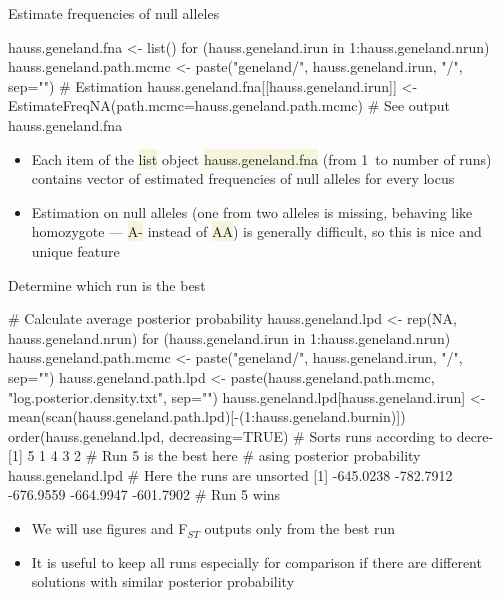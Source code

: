 \documentclass[compress, xelatex, 11pt, xcolor=svgnames, aspectratio=169, url={hyphens, lowtilde}]{beamer}
\renewcommand{\texttt}[1]{\colorbox{Beige}{{\ttfamily #1}}}
\begin{document}
\begin{frame}[fragile]{Estimate frequencies of null alleles}
	\begin{spluscode}
    hauss.geneland.fna <- list()
    for (hauss.geneland.irun in 1:hauss.geneland.nrun) {
      hauss.geneland.path.mcmc <- paste("geneland/", hauss.geneland.irun,
        "/", sep="")
      # Estimation
      hauss.geneland.fna[[hauss.geneland.irun]] <-
        EstimateFreqNA(path.mcmc=hauss.geneland.path.mcmc)
      }
    # See output
    hauss.geneland.fna
	\end{spluscode}
	\begin{itemize}
		\item Each item of the \texttt{list} object \texttt{hauss.geneland.fna} (from 1~to number of runs) contains vector of estimated frequencies of null alleles for every locus
		\item Estimation on null alleles (one from two alleles is missing, behaving like homozygote --- \texttt{A-} instead of \texttt{AA}) is generally difficult, so this is nice and unique feature
	\end{itemize}
\end{frame}

\begin{frame}[fragile]{Determine which run is the best}
	\begin{spluscode}
    # Calculate average posterior probability
    hauss.geneland.lpd <- rep(NA, hauss.geneland.nrun)
    for (hauss.geneland.irun in 1:hauss.geneland.nrun) {
      hauss.geneland.path.mcmc <- paste("geneland/", hauss.geneland.irun, "/",
        sep="")
      hauss.geneland.path.lpd <- paste(hauss.geneland.path.mcmc,
        "log.posterior.density.txt", sep="")
      hauss.geneland.lpd[hauss.geneland.irun] <-
        mean(scan(hauss.geneland.path.lpd)[-(1:hauss.geneland.burnin)]) }
    order(hauss.geneland.lpd, decreasing=TRUE) # Sorts runs according to decre-
    [1] 5 1 4 3 2 # Run 5 is the best here     # asing posterior probability
    hauss.geneland.lpd # Here the runs are unsorted
    [1] -645.0238 -782.7912 -676.9559 -664.9947 -601.7902 # Run 5 wins
	\end{spluscode}
	\begin{itemize}
		\item We will use figures and F$_{ST}$ outputs only from the best run
		\item It is useful to keep all runs especially for comparison if there are different solutions with similar posterior probability
	\end{itemize}
\end{frame}
\end{document}

